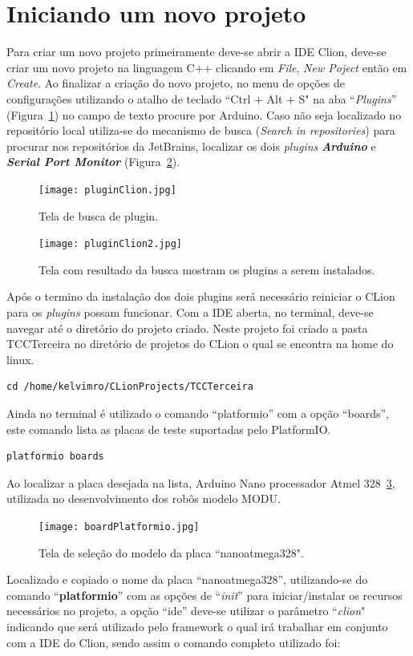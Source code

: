 \documentclass[a4paper,12pt,portuguese]{ufms-cpcx}
\begin{document}
\section{Iniciando um novo projeto}
Para criar um novo projeto primeiramente deve-se abrir a IDE Clion, deve-se criar um novo projeto na linguagem C++ clicando em \textit{File}, \textit{New Poject} então em \textit{Create}. Ao finalizar a criação do novo projeto, no menu de opções de configurações utilizando o atalho de teclado ``Ctrl + Alt + S" na aba ``\textit{Plugins}” (Figura~\ref{fig:tela1plugin}) no campo de texto procure por Arduino. Caso não seja localizado no repositório local utiliza-se do mecanismo de busca (\textit{Search in repositories}) para procurar nos repositórios da JetBrains, localizar os dois \textit{plugins} \textit{\textbf{Arduino}} e \textit{\textbf{Serial Port Monitor}} (Figura~\ref{fig:tela2plugin}).
\begin{figure}[H]	
	\centering
	\texttt{[image: pluginClion.jpg]}
	\caption{Tela de busca de plugin.}
	\label{fig:tela1plugin}
\end{figure}
\begin{figure}[H]	
	\centering
	\texttt{[image: pluginClion2.jpg]}
	\caption{Tela com resultado da busca mostram os plugins a serem instalados.}
	\label{fig:tela2plugin}
\end{figure}
Após o termino da instalação dos dois plugins será necessário reiniciar o CLion para os \textit{plugins} possam funcionar. Com a IDE aberta, no terminal, deve-se navegar até o diretório do projeto criado. Neste projeto foi criado a pasta TCCTerceira no diretório de projetos do CLion o qual se encontra na home do linux.
\begin{lstlisting}
cd /home/kelvimro/CLionProjects/TCCTerceira
\end{lstlisting}
Ainda no terminal é utilizado o comando ``platformio” com a opção ``boards”, este comando lista as placas de teste suportadas pelo PlatformIO.
\begin{lstlisting}
platformio boards
\end{lstlisting}
Ao localizar a placa desejada na lista, Arduino Nano processador Atmel 328~\ref{fig:telananoatmega328}, utilizada no desenvolvimento dos robôs modelo MODU.
\begin{figure}[H]	
	\centering
	\texttt{[image: boardPlatformio.jpg]}
	\caption{Tela de seleção do modelo da placa ``nanoatmega328".}
	\label{fig:telananoatmega328}	
\end{figure}
Localizado e copiado o nome da placa ``nanoatmega328”, utilizando-se do comando ``\textbf{platformio}” com as opções de ``\textit{init}” para iniciar/instalar os recursos necessários no projeto,  a opção ``ide” deve-se utilizar o parâmetro ``\textit{clion}" indicando que será utilizado pelo framework o qual irá trabalhar em conjunto com a IDE do Clion, sendo assim o comando completo utilizado foi:
\end{document}
